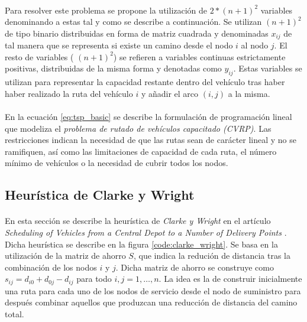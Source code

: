 \documentclass[spanish]{article}
\begin{document}
			\paragraph{}
			Para resolver este problema se propone la utilización de $2 * (n+1)^2$ variables denominando a estas tal y como se describe a continuación. Se utilizan $(n+1)^2$ de tipo binario distribuidas en forma de matriz cuadrada y denominadas $x_{ij}$ de tal manera que se representa si existe un camino desde el nodo $i$ al nodo $j$. El resto de variables ( $(n+1)^2$) se refieren a variables continuas estrictamente positivas, distribuidas de la misma forma y denotadas como $y_{ij}$. Estas variables se utilizan para representar la capacidad restante dentro del vehículo tras haber haber realizado la ruta del vehículo $i$ y añadir el arco $(i,j)$ a la misma.

			\paragraph{}
			En la ecuación \eqref{eq:tsp_basic} se describe la formulación de programación lineal que modeliza el \emph{problema de rutado de vehículos capacitado (CVRP)}. Las restricciones indican la necesidad de que las rutas sean de carácter lineal y no se ramifiquen, así como las limitaciones de capacidad de cada ruta, el número mínimo de vehículos o la necesidad de cubrir todos los nodos.

		\subsection{Heurística de Clarke y Wright}
		\label{sec:clarke_wright}

			\paragraph{}
			En esta sección se describe la heurística de \emph{Clarke y Wright} en el artículo \emph{Scheduling of Vehicles from a Central Depot to a Number of Delivery Points} \cite{clarke1964scheduling}. Dicha heurística se describe en la figura \ref{code:clarke_wright}. Se basa en la utilización de la matriz de ahorro $S$, que indica la redución de distancia tras la combinación de los nodos $i$ y $j$. Dicha matriz de ahorro se construye como ${s_{ij}=d_{i0}+d_{0j}-d_{ij}}$ para todo ${i,j=1,…,n}$. La idea es la de construir inicialmente una ruta para cada uno de los nodos de servicio desde el nodo de suministro para después combinar aquellos que produzcan una reducción de distancia del camino total.
\end{document}
